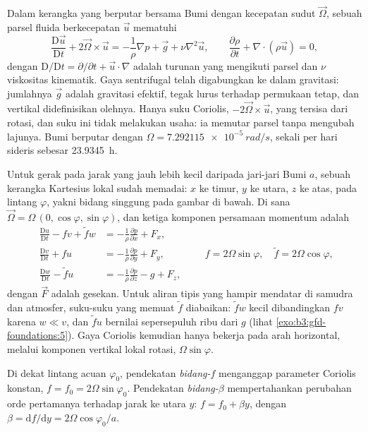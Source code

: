 Dalam kerangka yang berputar bersama Bumi dengan kecepatan sudut
$\vec\Omega$, sebuah parsel fluida berkecepatan $\vec u$ mematuhi
\[
\frac{\mathrm D\vec u}{\mathrm Dt} + 2\vec\Omega\times\vec u =
-\frac{1}{\rho}\nabla p + \vec g + \nu\nabla^2\vec u ,
\qquad
\frac{\partial\rho}{\partial t} + \nabla\cdot(\rho\vec u) = 0 ,
\]
dengan $\mathrm D/\mathrm Dt = \partial/\partial t + \vec u\cdot\nabla$ adalah
turunan yang mengikuti parsel dan $\nu$ viskositas kinematik. Gaya
sentrifugal telah digabungkan ke dalam gravitasi: jumlahnya $\vec g$ adalah
gravitasi efektif, tegak lurus terhadap permukaan  tetap, dan
vertikal didefinisikan olehnya. Hanya suku Coriolis, $-2\vec\Omega\times
\vec u$, yang tersisa dari rotasi, dan suku ini tidak melakukan usaha: ia memutar
parsel tanpa mengubah lajunya. Bumi berputar dengan $\Omega =
\qty{7.292115e-5}{rad/s}$, sekali per hari sideris sebesar \qty{23.9345}{h}.

Untuk gerak pada jarak yang jauh lebih kecil daripada jari-jari Bumi $a$, sebuah
kerangka Kartesius lokal sudah memadai: $x$ ke timur, $y$ ke utara, $z$ ke atas,
pada lintang $\varphi$, yakni bidang singgung pada gambar di bawah. Di sana
$\vec\Omega = \Omega\,(0, \cos\varphi, \sin\varphi)$, dan ketiga
komponen persamaan momentum adalah
\[
\begin{aligned}
\frac{\mathrm Du}{\mathrm Dt} - f v + \tilde f w &= -\frac{1}{\rho}\frac{\partial p}{\partial x} + F_x ,\\
\frac{\mathrm Dv}{\mathrm Dt} + f u &= -\frac{1}{\rho}\frac{\partial p}{\partial y} + F_y ,\\
\frac{\mathrm Dw}{\mathrm Dt} - \tilde f u &= -\frac{1}{\rho}\frac{\partial p}{\partial z} - g + F_z ,
\end{aligned}
\qquad f = 2\Omega\sin\varphi,\quad \tilde f = 2\Omega\cos\varphi ,
\]
dengan $\vec F$ adalah gesekan. Untuk aliran tipis yang hampir mendatar di
samudra dan atmosfer, suku-suku yang memuat $\tilde f$ diabaikan: $\tilde f w$
kecil dibandingkan $fv$ karena $w \ll v$, dan $\tilde f u$ bernilai sepersepuluh
ribu dari $g$ (lihat \cref{exo:b3:gfd-foundations:5}). Gaya Coriolis kemudian hanya
bekerja pada arah horizontal, melalui komponen vertikal lokal rotasi,
$\Omega\sin\varphi$.

\begin{definition}\label{def:b3:gfd-foundations:planes}
Di dekat lintang acuan $\varphi_0$, pendekatan \emph{bidang-$f$}
menganggap parameter Coriolis konstan, $f = f_0 =
2\Omega\sin\varphi_0$. Pendekatan \emph{bidang-$\beta$}
mempertahankan perubahan orde pertamanya terhadap jarak ke utara $y$:
$f = f_0 + \beta y$, dengan $\beta = \mathrm df/\mathrm dy = 2\Omega
\cos\varphi_0/a$.
\end{definition}

